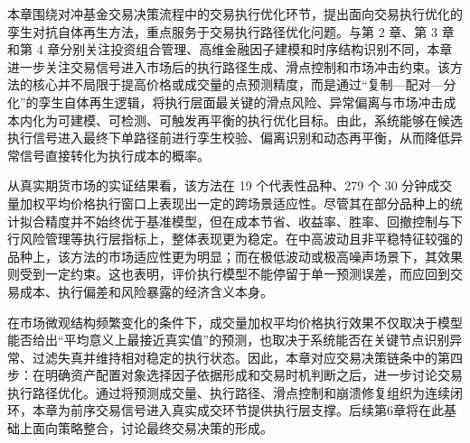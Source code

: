 本章围绕对冲基金交易决策流程中的交易执行优化环节，提出面向交易执行优化的孪生对抗自体再生方法，重点服务于交易执行路径优化问题。与第 2 章、第 3 章和第 4 章分别关注投资组合管理、高维金融因子建模和时序结构识别不同，本章进一步关注交易信号进入市场后的执行路径生成、滑点控制和市场冲击约束。该方法的核心并不局限于提高价格或成交量的点预测精度，而是通过“复制—配对—分化”的孪生自体再生逻辑，将执行层面最关键的滑点风险、异常偏离与市场冲击成本内化为可建模、可检测、可触发再平衡的执行优化目标。由此，系统能够在候选执行信号进入最终下单路径前进行孪生校验、偏离识别和动态再平衡，从而降低异常信号直接转化为执行成本的概率。

从真实期货市场的实证结果看，该方法在 19 个代表性品种、279 个 30 分钟成交量加权平均价格执行窗口上表现出一定的跨场景适应性。尽管其在部分品种上的统计拟合精度并不始终优于基准模型，但在成本节省、收益率、胜率、回撤控制与下行风险管理等执行层指标上，整体表现更为稳定。在中高波动且非平稳特征较强的品种上，该方法的市场适应性更为明显；而在极低波动或极高噪声场景下，其效果则受到一定约束。这也表明，评价执行模型不能停留于单一预测误差，而应回到交易成本、执行偏差和风险暴露的经济含义本身。

在市场微观结构频繁变化的条件下，成交量加权平均价格执行效果不仅取决于模型能否给出“平均意义上最接近真实值”的预测，也取决于系统能否在关键节点识别异常、过滤失真并维持相对稳定的执行状态。因此，本章对应交易决策链条中的第四步：在明确资产配置对象选择因子依据形成和交易时机判断之后，进一步讨论交易执行路径优化。通过将预测成交量、执行路径、滑点控制和崩溃修复组织为连续闭环，本章为前序交易信号进入真实成交环节提供执行层支撑。后续第6章将在此基础上面向策略整合，讨论最终交易决策的形成。
